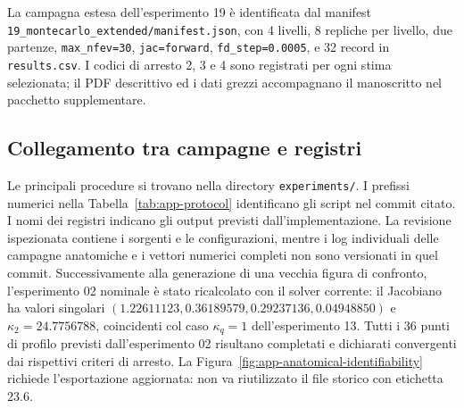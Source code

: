 La campagna estesa dell'esperimento 19 è identificata dal manifest \texttt{19\_montecarlo\_extended/manifest.json}, con 4 livelli, 8 repliche per livello, due partenze, \texttt{max\_nfev=30}, \texttt{jac=forward}, \texttt{fd\_step=0.0005}, e 32 record in \texttt{results.csv}. I codici di arresto 2, 3 e 4 sono registrati per ogni stima selezionata; il PDF descrittivo ed i dati grezzi accompagnano il manoscritto nel pacchetto supplementare.

\subsection{Collegamento tra campagne e registri}
Le principali procedure si trovano nella directory \texttt{experiments/}. I prefissi numerici nella Tabella~\ref{tab:app-protocol} identificano gli script nel commit citato. I nomi dei registri indicano gli output previsti dall'implementazione. La revisione ispezionata contiene i sorgenti e le configurazioni, mentre i log individuali delle campagne anatomiche e i vettori numerici completi non sono versionati in quel commit. Successivamente alla generazione di una vecchia figura di confronto, l'esperimento 02 nominale è stato ricalcolato con il solver corrente: il Jacobiano ha valori singolari $(1.22611123,0.36189579,0.29237136,0.04948850)$ e $\kappa_2=24.7756788$, coincidenti col caso $\kappa_q=1$ dell'esperimento 13. Tutti i 36 punti di profilo previsti dall'esperimento 02 risultano completati e dichiarati convergenti dai rispettivi criteri di arresto. La Figura~\ref{fig:app-anatomical-identifiability} richiede l'esportazione aggiornata: non va riutilizzato il file storico con etichetta $23.6$.

